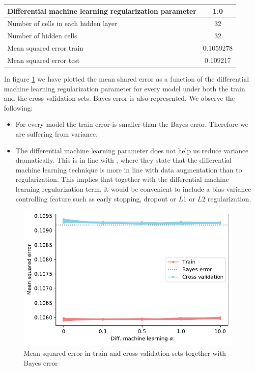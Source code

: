 \begin{center}
\begin{tabular}{||l | c||} 
 \hline
Differential machine learning regularization parameter & 1.0 \\
 \hline
Number of cells in each hidden layer &  32 \\
  \hline
Number of hidden cells &  32 \\
  \hline
Mean squared error train &  0.1059278 \\
  \hline
Mean squared error test &  0.109217 \\
  \hline
 \end{tabular}
\end{center}

In figure \ref{fig:MSE_CV_train_test} we have plotted the mean shared error as a function of the differential machine learning regularization parameter for every model under both the train and the cross validation sets. Bayes error is also represented. We observe the following:

\begin{itemize}
    \item For every model the train error is smaller than the Bayes error. Therefore we are suffering from variance.   
    \item The differential machine learning parameter does not help us reduce variance dramatically. This is in line with \cite{HugeSavine}, where they state that the differential machine learning technique is more in line with data augmentation than to regularization. This implies that together with the differential machine learning regularization term, it would be convenient to include a bias-variance controlling feature such as early stopping, dropout or $L1$ or $L2$ regularization.
\end{itemize}


\begin{figure}[H] 
\centering
\includegraphics[width=1.0\textwidth]{Figures/MarketRisk/train_test_mse.pdf}
\caption{Mean squared error in train and cross validation sets together with Bayes error}
\label{fig:MSE_CV_train_test}
\end{figure}

